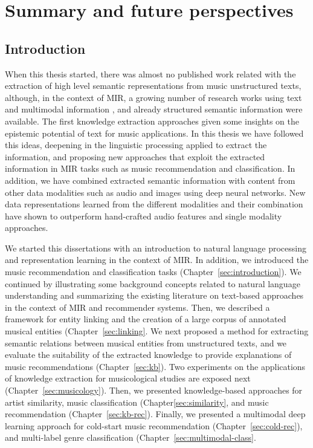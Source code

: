 
\chapter{Summary and future perspectives}
\label{sec:conclusion}

\section{Introduction}

When this thesis started, there was almost no published work related with the extraction of high level semantic representations from music unstructured texts, although, in the context of MIR, a growing number of research works using text and multimodal information \cite{}, and already structured semantic information \cite{} were available. The first knowledge extraction approaches \cite{Tata2010,Knees2011,Sordo2012} given some insights on the epistemic potential of text for music applications. In this thesis we have followed this ideas, deepening in the linguistic processing applied to extract the information, and proposing new approaches that exploit the extracted information in MIR tasks such as music recommendation and classification. In addition, we have combined extracted semantic information with content from other data modalities such as audio and images using deep neural networks. New data representations learned from the different modalities and their combination have shown to outperform hand-crafted audio features and single modality approaches.

We started this dissertations with an introduction to natural language processing and representation learning in the context of MIR. In addition, we introduced the music recommendation and classification tasks (Chapter~\ref{sec:introduction}). We continued by illustrating some background concepts related to natural language understanding and summarizing the existing literature on text-based approaches in the context of MIR and recommender systems. Then, we described a framework for entity linking and the creation of a large corpus of annotated musical entities (Chapter~\ref{sec:linking}. We next proposed a method for extracting semantic relations between musical entities from unstructured texts, and we evaluate the suitability of the extracted knowledge to provide explanations of music recommendations (Chapter~\ref{sec:kb}). Two experiments on the applications of knowledge extraction for musicological studies are exposed next (Chapter~\ref{sec:musicology}). Then, we presented knowledge-based approaches for artist similarity, music classification (Chapter\ref{sec:similarity}, and music recommendation (Chapter~\ref{sec:kb-rec}). Finally, we presented a multimodal deep learning approach for cold-start music recommendation (Chapter~\ref{sec:cold-rec}), and multi-label genre classification (Chapter~\ref{sec:multimodal-class}.

